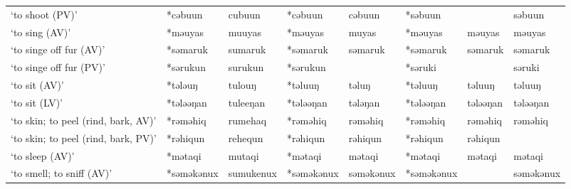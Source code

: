 \begin{landscape}
\begin{longtable}[c]{@{}p{3cm}<{\raggedright}p{2.75cm}<{\raggedright}p{2.75cm}<{\raggedright}p{2.75cm}<{\raggedright}p{2.75cm}<{\raggedright}p{2.75cm}<{\raggedright}p{2.75cm}<{\raggedright}p{2.75cm}<{\raggedright}@{}}
`to shoot (PV)'                                      & *cəbuun            & cubuun                         & *cəbuun            & cəbuun                     & *səbuun          &                          & səbuun                            \\
`to sing (AV)'                                       & *məuyas            & muuyas                         & *məuyas            & muyas                      & *məuyas          & məuyas                   & məuyas                            \\
`to singe off fur (AV)'                              & *səmaruk           & sumaruk                        & *səmaruk           & səmaruk                    & *səmaruk         & səmaruk                  & səmaruk                           \\
`to singe off fur (PV)'                              & *sərukun           & surukun                        & *sərukun           &                            & *səruki          &                          & səruki                            \\
`to sit (AV)'                                        & *tələuŋ            & tulouŋ                         & *təluuŋ            & təluŋ                      & *təluuŋ          & təluuŋ                   & təluuŋ                            \\
`to sit (LV)'                                        & *tələəŋan          & tuleeŋan                       & *tələəŋan          & tələŋan                    & *tələəŋan        & tələəŋan                 & tələəŋan                          \\
`to skin; to peel (rind, bark, AV)'                  & *rəməhiq           & rumehaq                        & *rəməhiq           & rəməhiq                    & *rəməhiq         & rəməhiq                  & rəməhiq                           \\
`to skin; to peel (rind, bark, PV)'                  & *rəhiqun           & rehequn                        & *rəhiqun           & rəhiqun                    & *rəhiqun         & rəhiqun                  &                                   \\
`to sleep (AV)'                                      & *mətaqi            & mutaqi                         & *mətaqi            & mətaqi                     & *mətaqi          & mətaqi                   & mətaqi                            \\
`to smell; to sniff (AV)'                            & *səməkənux         & sumukenux                      & *səməkənux         & səməkənux                  & *səməkənux       &                          & səməkənux                         \\

\end{longtable}
\end{landscape}
